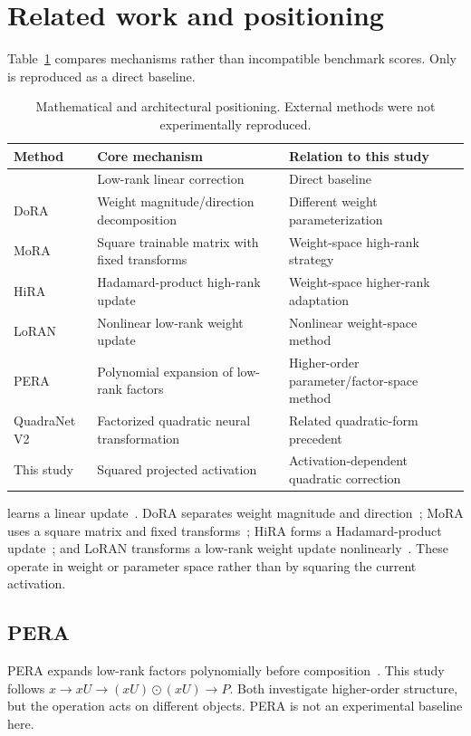 \documentclass[11pt]{article}
\begin{document}
\section{Related work and positioning}
Table~\ref{tab:related} compares mechanisms rather than incompatible benchmark scores. Only \lora{} is reproduced as a direct baseline.
\begin{table}[ht]\centering\small
\caption{Mathematical and architectural positioning. External methods were not experimentally reproduced.}\label{tab:related}
\begin{tabular}{p{.13\linewidth}p{.38\linewidth}p{.39\linewidth}}\toprule
Method&Core mechanism&Relation to this study\\\midrule
\lora{}&Low-rank linear correction&Direct baseline\\
DoRA&Weight magnitude/direction decomposition&Different weight parameterization\\
MoRA&Square trainable matrix with fixed transforms&Weight-space high-rank strategy\\
HiRA&Hadamard-product high-rank update&Weight-space higher-rank adaptation\\
LoRAN&Nonlinear low-rank weight update&Nonlinear weight-space method\\
PERA&Polynomial expansion of low-rank factors&Higher-order parameter/factor-space method\\
QuadraNet V2&Factorized quadratic neural transformation&Related quadratic-form precedent\\
This study&Squared projected activation&Activation-dependent quadratic correction\\\bottomrule
\end{tabular}\end{table}
\lora{} learns a linear update~\cite{hu2022lora}. DoRA separates weight magnitude and direction~\cite{liu2024dora}; MoRA uses a square matrix and fixed transforms~\cite{jiang2024mora}; HiRA forms a Hadamard-product update~\cite{huang2025hira}; and LoRAN transforms a low-rank weight update nonlinearly~\cite{li2024loran}. These operate in weight or parameter space rather than by squaring the current activation.

\subsection{PERA} PERA expands low-rank factors polynomially before composition~\cite{zhang2026pera}. This study follows $x\to xU\to(xU)\odot(xU)\to P$. Both investigate higher-order structure, but the operation acts on different objects. PERA is not an experimental baseline here.
\end{document}
